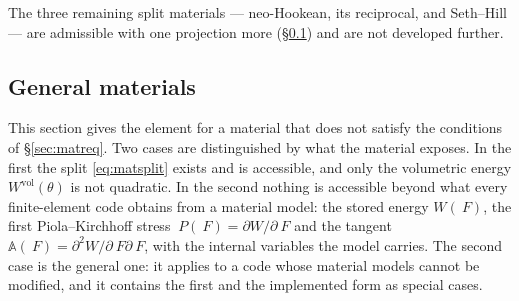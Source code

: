 \documentclass[11pt]{article}
\newcommand{\F}{~F}
\renewcommand{\P}{~P}
\newcommand{\supvol}{^{\mathrm{vol}}}
\theoremstyle{definition}
\theoremstyle{plain}
\begin{document}
The three remaining split materials --- neo-Hookean, its reciprocal, and
Seth--Hill --- are admissible with one projection more
(\S\ref{sec:general}) and are not developed further.

\subsection{General materials}
\label{sec:general}

This section gives the element for a material that does not satisfy the
conditions of \S\ref{sec:matreq}. Two cases are distinguished by what the
material exposes. In the first the split \eqref{eq:matsplit} exists and is
accessible, and only the volumetric energy $W\supvol(\theta)$ is not
quadratic. In the second nothing is accessible beyond what every
finite-element code obtains from a material model: the stored energy
$W(\F)$, the first Piola--Kirchhoff stress $\P(\F) = \partial W/\partial\F$
and the tangent $\mathbb{A}(\F) = \partial^2 W/\partial\F\partial\F$, with
the internal variables the model carries. The second case is the general
one: it applies to a code whose material models cannot be modified, and it
contains the first and the implemented form as special cases.
\end{document}
